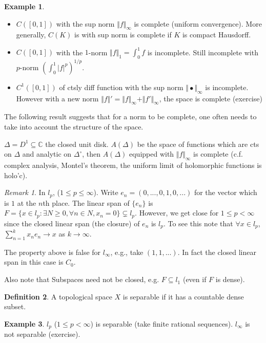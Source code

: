 \documentclass{article}
\theoremstyle{definition}
\newtheorem{defn}{Definition}[section]
\newtheorem{example}[defn]{Example}
\theoremstyle{remark}
\newtheorem{rem}{Remark}
\theoremstyle{plain}
\newcommand{\CC}{\mathbb{C}}
\begin{document}
\begin{example}
    \begin{itemize}
        \item $C([0,1])$ with the sup norm $\Vert f\Vert_\infty$ is complete (uniform convergence). More generally, $C(K)$ is with sup norm is complete if $K$ is compact Hausdorff.
        \item $C([0,1])$ with the $1$-norm $\Vert f\Vert_1=\int_0^1 f$ is incomplete. Still incomplete with $p$-norm $(\int_0^1 |f|^p)^{1/p}$.
        \item $C^1([0,1])$ of ctsly diff function with the sup norm $\Vert\bullet\Vert_\infty$ is incomplete. However with a new norm $\Vert f\Vert'=\Vert f\Vert_\infty+\Vert f'\Vert_\infty$, the space is complete (exercise)

    \end{itemize} The following result suggests that for a norm to be complete, one often needs to take into account the structure of the space.

    $\Delta=D^1\subseteq\CC$ the closed unit disk. $A(\Delta)$ be the space of functions which are cts on $\Delta$ and analytic on $\Delta^\circ$, then $A(\Delta)$ equipped with $\Vert f\Vert_\infty$ is complete (c.f. complex analysis, Montel's theorem, the uniform limit of holomorphic functions is holo'c).
\end{example}
\begin{rem}
    In $l_p$, ($1\le p\le\infty$). Write $e_n=(0,...,0,1,0,...)$ for the vector which is $1$ at the $n$th place. The linear span of $\{e_n\}$ is $F=\{x\in l_p:\exists N\ge 0,\forall n\in N,x_n=0\}\subsetneq l_p$. However, we get close for $1\le p<\infty$ since the closed linear span (the closure) of $e_n$ is $l_p$. To see this note that $\forall x\in l_p$, $\sum_{n=1}^k x_ne_n\to x$ as $k\to\infty$.

    The property above is false for $l_\infty$, e.g., take $(1,1,...)$. In fact the closed linear span in this case is $C_0$.

    Also note that Subspaces need not be closed, e.g. $F\subseteq l_1$ (even if $F$ is dense).
\end{rem}
\begin{defn}
    A topological space $X$ is separable if it has a countable dense subset.
\end{defn}
\begin{example}
    $l_p$ ($1\le p<\infty$) is separable (take finite rational sequences). $l_\infty$ is not separable (exercise).
\end{example}
\end{document}
